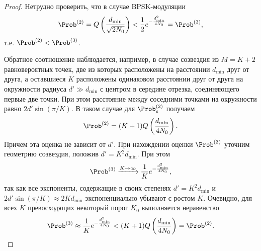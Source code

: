 \documentclass{book}
\numberwithin{theorem}{chapter}
\numberwithin{statement}{chapter}
\numberwithin{lemma}{chapter}
\theoremstyle{definition}
\numberwithin{task}{chapter}
\theoremstyle{remark}
\numberwithin{example}{chapter}
\theoremstyle{definition}
\numberwithin{definition}{chapter}
\theoremstyle{remark}
\theoremstyle{remark}
\numberwithin{lyrics}{section}
\begin{document}
\begin{proof}
Нетрудно проверить, что в случае BPSK-модуляции
$$
\Prob^{(2)} = Q\left(\frac{d_{\text{min}}}{\sqrt{2N_0}}\right) < \frac{1}{2} e^{-\frac{d^2_{\text{min}}}{4N_0}} = \Prob^{(3)},
$$
т.е. $\Prob^{(2)} < \Prob^{(3)}$. 

Обратное соотношение наблюдается, например, в случае созвездия из $M = K + 2$ равновероятных точек, две из которых расположены на расстоянии $d_{\text{min}}$ друг от друга, а оставшиеся $K$ расположены одинаковом расстоянии друг от друга на окружности радиуса $d' \gg d_{\text{min}}$ с центром в середине отрезка, соединяющего первые две точки. При этом расстояние между соседними точками на окружности равно $2d'\sin(\pi / K)$. В таком случае для $\Prob_{e}^{(2)}$ получаем
$$
\Prob^{(2)} = (K + 1) Q\left(\frac{d_{\text{min}}}{4N_0}\right).
$$
Причем эта оценка не зависит от $d'$. При нахождении оценки $\Prob^{(3)}$ уточним геометрию созвездия, положив $d' = K^2 d_{\text{min}}$. При этом
$$
\Prob^{(3)} \xrightarrow{K \rightarrow \infty}\frac{1}{K} e^{-\frac{d_{\text{min}}^2}{4N_0}},
$$
так как все экспоненты, содержащие в своих степенях $d' = K^2 d_{\text{min}}$ и $2d'\sin(\pi / K) \approx 2Kd_{\text{min}}$ экспоненциально убывают с ростом $K$. Очевидно, для всех $K$ превосходящих некоторый порог $K_0$ выполняется неравенство
$$
\Prob^{(3)} \approx \frac{1}{K} e^{-\frac{d_{\text{min}}^2}{4N_0}} < (K + 1) Q\left(\frac{d_{\text{min}}}{4N_0}\right) = \Prob^{(2)}.
$$


\end{proof}
\end{document}
